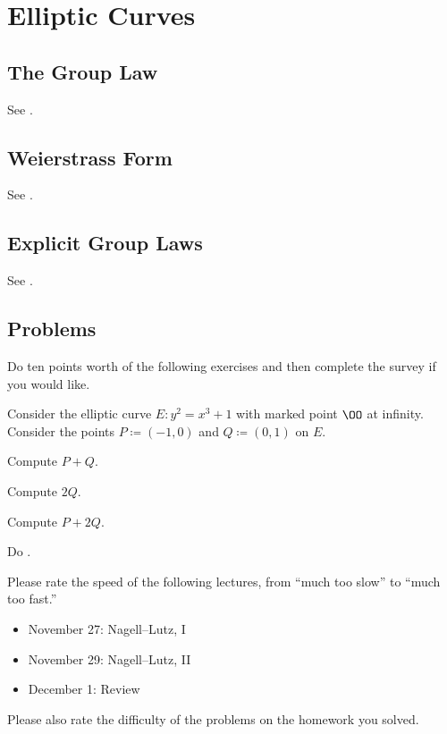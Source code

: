 \documentclass[../notes.tex]{subfiles}
\begin{document}
\section{Elliptic Curves}

\subsection{The Group Law}
See \cite[section~1.1]{silverman-tate}.

\subsection{Weierstrass Form}
See \cite[section~1.2]{silverman-tate}.

\subsection{Explicit Group Laws}
See \cite[sections~1.3 and 2.3]{silverman-tate}.

\subsection{Problems}
Do ten points worth of the following exercises and then complete the survey if you would like.
\begin{prob}[5 points]
	Consider the elliptic curve $E\colon y^2=x^3+1$ with marked point $\OO$ at infinity. Consider the points $P\coloneqq(-1,0)$ and $Q\coloneqq(0,1)$ on $E$.
	\begin{listalph}
		\item Compute $P+Q$.
		\item Compute $2Q$.
		\item Compute $P+2Q$.
	\end{listalph}
\end{prob}
\begin{prob}[5 points]
	Do \cite[problem~1.19]{silverman-tate}.
\end{prob}
\begin{prob}[0 points]
	Please rate the speed of the following lectures, from ``much too slow'' to ``much too fast.''
	\begin{itemize}
		\item November 27: Nagell--Lutz, I
		\item November 29: Nagell--Lutz, II
		\item December 1: Review
	\end{itemize}
	Please also rate the difficulty of the problems on the homework you solved.
\end{prob}
\end{document}

